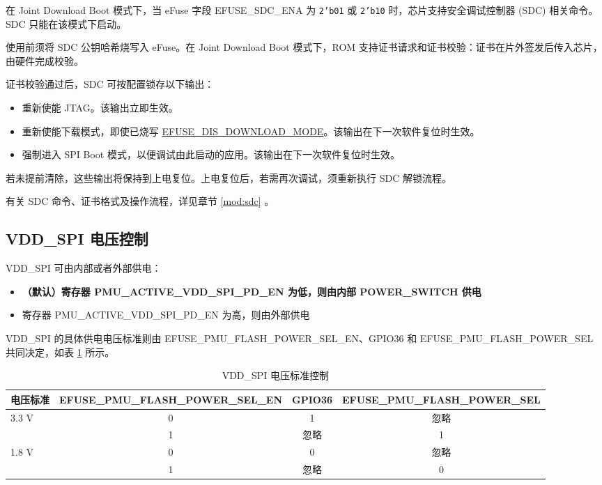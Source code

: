 \documentclass[main\_\_CN.tex]{subfiles}
\begin{document}
在 Joint Download Boot 模式下，当 eFuse 字段 EFUSE\_SDC\_ENA 为 \texttt{2'b01} 或 \texttt{2'b10} 时，芯片支持安全调试控制器 (SDC) 相关命令。SDC 只能在该模式下启动。

使用前须将 SDC 公钥哈希烧写入 eFuse。在 Joint Download Boot 模式下，ROM 支持证书请求和证书校验：证书在片外签发后传入芯片，由硬件完成校验。

证书校验通过后，SDC 可按配置锁存以下输出：

\begin{itemize}
    \item 重新使能 JTAG。该输出立即生效。
    \item 重新使能下载模式，即使已烧写 \hyperref[fielddesc:EFUSEDISDOWNLOADMODE]{EFUSE\_DIS\_DOWNLOAD\_MODE}。该输出在下一次软件复位时生效。
    \item 强制进入 SPI Boot 模式，以便调试由此启动的应用。该输出在下一次软件复位时生效。
\end{itemize}

若未提前清除，这些输出将保持到上电复位。上电复位后，若需再次调试，须重新执行 SDC 解锁流程。

有关 SDC 命令、证书格式及操作流程，详见章节 \ref{mod:sdc} \textit{}。


\subsection{VDD\_SPI 电压控制}
\label{sec:vdd-spi-voltage}

VDD\_SPI 可由内部或者外部供电：
    \begin{itemize}
    \item \textbf{（默认）寄存器 PMU\_ACTIVE\_VDD\_SPI\_PD\_EN 为低，则由内部 POWER\_SWITCH 供电}
    \item 寄存器 PMU\_ACTIVE\_VDD\_SPI\_PD\_EN 为高，则由外部供电
\end{itemize}


VDD\_SPI 的具体供电电压标准则由 EFUSE\_PMU\_FLASH\_POWER\_SEL\_EN、GPIO36 和 EFUSE\_PMU\_FLASH\_POWER\_SEL 共同决定，如表 \ref{tab:vdd-spi-voltage-control} \textit{} 所示。

\begin{table}[H]
    \centering
    \caption{VDD\_SPI 电压标准控制}
    \label{tab:vdd-spi-voltage-control}
    \begin{tabular}{ | l | c | c | c |}
    \hline
    
    \rowcolor{lightgray}
    \textbf{电压标准}  & 
    \textbf{EFUSE\_PMU\_FLASH\_POWER\_SEL\_EN} & \textbf{GPIO36} & \textbf{EFUSE\_PMU\_FLASH\_POWER\_SEL} \\\hline
    
    \multirow{2}{*}{3.3 V} &
    0 & 1 & 忽略 \\ \cline{2-4} &
    1 & 忽略 &1  \\\hline
    \multirow{2}{*}{1.8 V} &
    0 & 0 & 忽略 \\ \cline{2-4} &
    1 & 忽略 & 0  \\\hline

    \end{tabular}
\end{table}
\end{document}
